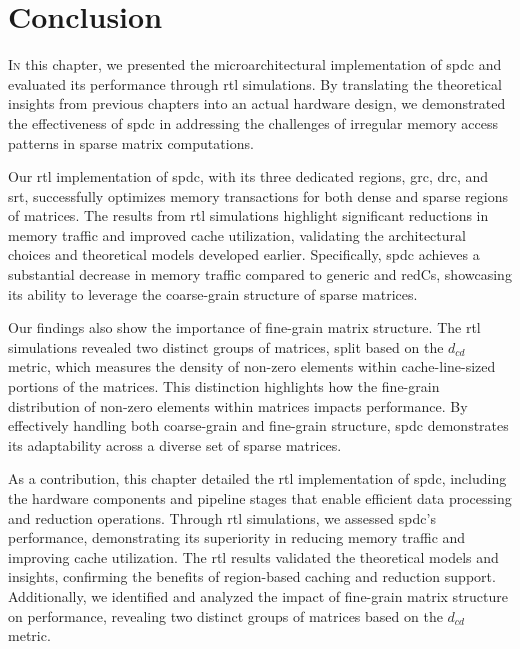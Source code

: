 
\section{Conclusion}
\label{sec:arch:conclu}

\lettrine{I}{n} this chapter, we presented the microarchitectural implementation of \acrlong{spdc} and evaluated its performance through \acrshort{rtl} simulations.
By translating the theoretical insights from previous chapters into an actual hardware design, we demonstrated the effectiveness of \acrlong{spdc} in addressing the challenges of irregular memory access patterns in sparse matrix computations.

Our \acrshort{rtl} implementation of \acrlong{spdc}, with its three dedicated regions, \acrshort{grc}, \acrshort{drc}, and \acrshort{srt}, successfully optimizes memory transactions for both dense and sparse regions of matrices.
The results from \acrshort{rtl} simulations highlight significant reductions in memory traffic and improved cache utilization, validating the architectural choices and theoretical models developed earlier.
Specifically, \acrlong{spdc} achieves a substantial decrease in memory traffic compared to generic and \glspl{redC}, showcasing its ability to leverage the coarse-grain structure of sparse matrices.

Our findings also show the importance of fine-grain matrix structure.
The \acrshort{rtl} simulations revealed two distinct groups of matrices, split based on the $d_\mathit{cd}$ metric, which measures the density of non-zero elements within cache-line-sized portions of the matrices.
This distinction highlights how the fine-grain distribution of non-zero elements within matrices impacts performance.
By effectively handling both coarse-grain and fine-grain structure, \acrlong{spdc} demonstrates its adaptability across a diverse set of sparse matrices.

As a contribution, this chapter detailed the \acrshort{rtl} implementation of \acrlong{spdc}, including the hardware components and \gls{pipeline} stages that enable efficient data processing and \gls{reduction} operations.
Through \acrshort{rtl} simulations, we assessed \acrlong{spdc}'s performance, demonstrating its superiority in reducing memory traffic and improving cache utilization.
The \acrshort{rtl} results validated the theoretical models and insights, confirming the benefits of region-based caching and \gls{reduction} support.
Additionally, we identified and analyzed the impact of fine-grain matrix structure on performance, revealing two distinct groups of matrices based on the $d_\mathit{cd}$ metric.


